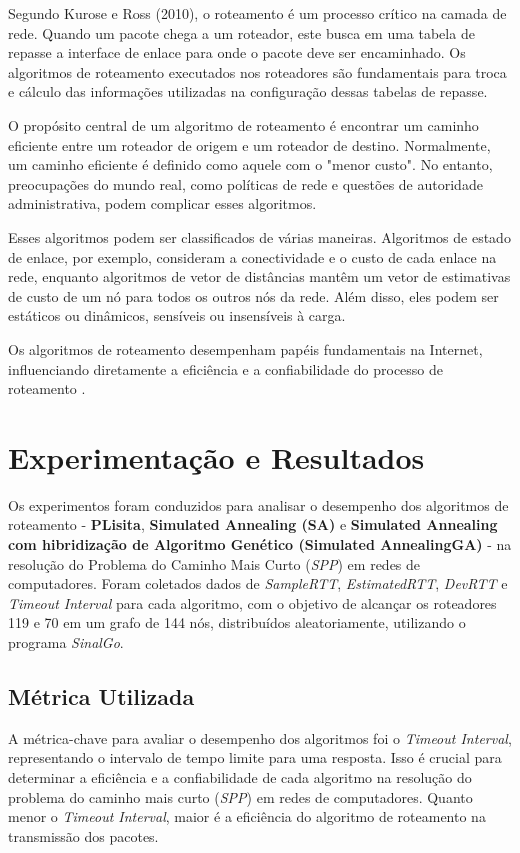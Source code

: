 \documentclass[conference]{IEEEtran}
\begin{document}
Segundo Kurose e Ross (2010), o roteamento é um processo crítico na camada de rede. Quando um pacote chega a um roteador, este busca em uma tabela de repasse a interface de enlace para onde o pacote deve ser encaminhado. Os algoritmos de roteamento executados nos roteadores são fundamentais para troca e cálculo das informações utilizadas na configuração dessas tabelas de repasse.

O propósito central de um algoritmo de roteamento é encontrar um caminho eficiente entre um roteador de origem e um roteador de destino. Normalmente, um caminho eficiente é definido como aquele com o "menor custo". No entanto, preocupações do mundo real, como políticas de rede e questões de autoridade administrativa, podem complicar esses algoritmos.

Esses algoritmos podem ser classificados de várias maneiras. Algoritmos de estado de enlace, por exemplo, consideram a conectividade e o custo de cada enlace na rede, enquanto algoritmos de vetor de distâncias mantêm um vetor de estimativas de custo de um nó para todos os outros nós da rede. Além disso, eles podem ser estáticos ou dinâmicos, sensíveis ou insensíveis à carga.

Os algoritmos de roteamento desempenham papéis fundamentais na Internet, influenciando diretamente a eficiência e a confiabilidade do processo de roteamento \cite{KuroseRoss2010}.

\section{Experimentação e Resultados}

Os experimentos foram conduzidos para analisar o desempenho dos algoritmos de roteamento - \textbf{PLisita}, \textbf{Simulated Annealing (SA)} e \textbf{Simulated Annealing com hibridização de Algoritmo Genético (Simulated AnnealingGA)} - na resolução do Problema do Caminho Mais Curto (\textit{SPP}) em redes de computadores. Foram coletados dados de \textit{SampleRTT}, \textit{EstimatedRTT}, \textit{DevRTT} e \textit{Timeout Interval} para cada algoritmo, com o objetivo de alcançar os roteadores 119 e 70 em um grafo de 144 nós, distribuídos aleatoriamente, utilizando o programa \textit{SinalGo}.

\subsection{Métrica Utilizada}
A métrica-chave para avaliar o desempenho dos algoritmos foi o \textit{Timeout Interval}, representando o intervalo de tempo limite para uma resposta. Isso é crucial para determinar a eficiência e a confiabilidade de cada algoritmo na resolução do problema do caminho mais curto (\textit{SPP}) em redes de computadores. Quanto menor o \textit{Timeout Interval}, maior é a eficiência do algoritmo de roteamento na transmissão dos pacotes.
\end{document}
